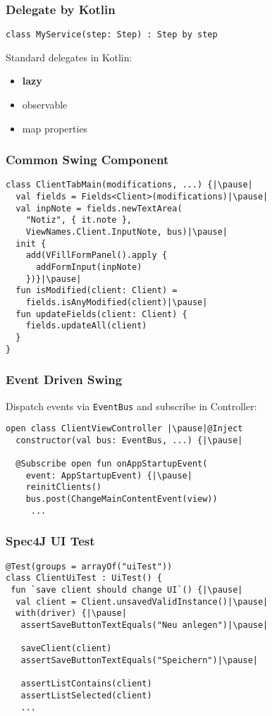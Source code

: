 \begin{frame}[fragile] \frametitle{Delegate by Kotlin}
\begin{lstlisting}
class MyService(step: Step) : Step by step
\end{lstlisting}
\pause
\vspace{0.5cm}
Standard delegates in Kotlin:
\begin{itemize}
	\item \textbf{lazy}
	\item observable
	\item map properties
\end{itemize}
\end{frame}



\begin{frame}[fragile] \frametitle{Common Swing Component}
\begin{lstlisting}
class ClientTabMain(modifications, ...) {|\pause|
  val fields = Fields<Client>(modifications)|\pause|
  val inpNote = fields.newTextArea(
    "Notiz", { it.note },
    ViewNames.Client.InputNote, bus)|\pause|
  init {
    add(VFillFormPanel().apply {
      addFormInput(inpNote)
    })}|\pause|
  fun isModified(client: Client) = 
    fields.isAnyModified(client)|\pause|
  fun updateFields(client: Client) {
    fields.updateAll(client)
  }
}
\end{lstlisting}
\end{frame}

\begin{frame}[fragile] \frametitle{Event Driven Swing}
Dispatch events via \texttt{EventBus} and subscribe in Controller:
\begin{lstlisting}
open class ClientViewController |\pause|@Inject
  constructor(val bus: EventBus, ...) {|\pause|
     
  @Subscribe open fun onAppStartupEvent(
    event: AppStartupEvent) {|\pause|
    reinitClients()
    bus.post(ChangeMainContentEvent(view))
     ...
\end{lstlisting}
\end{frame}

\begin{frame}[fragile] \frametitle{Spec4J UI Test}
\begin{lstlisting}
@Test(groups = arrayOf("uiTest"))
class ClientUiTest : UiTest() {
 fun `save client should change UI`() {|\pause|
  val client = Client.unsavedValidInstance()|\pause|
  with(driver) {|\pause|
   assertSaveButtonTextEquals("Neu anlegen")|\pause|

   saveClient(client)
   assertSaveButtonTextEquals("Speichern")|\pause|

   assertListContains(client)
   assertListSelected(client)
   ...
\end{lstlisting}
\end{frame}


